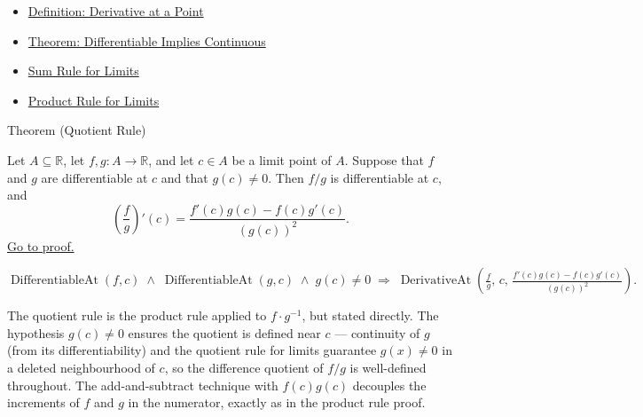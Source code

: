 \begin{dependencies}
\begin{itemize}
  \item \hyperref[def:derivative-at-a-point]{Definition: Derivative at a Point}
  \item \hyperref[thm:differentiable-implies-continuous]{Theorem: Differentiable Implies Continuous}
  \item \hyperref[thm:limit-sum]{Sum Rule for Limits}
  \item \hyperref[thm:limit-product]{Product Rule for Limits}
\end{itemize}
\end{dependencies}


\begin{theorembox}{Theorem (Quotient Rule)}
\begin{theorem}
\label{thm:quotient-rule}
Let $A \subseteq \mathbb{R}$, let $f, g : A \to \mathbb{R}$, and let $c \in A$ be a limit point of $A$. Suppose that $f$ and $g$ are differentiable at $c$ and that $g(c) \neq 0$. Then $f/g$ is differentiable at $c$, and
\[
\left(\frac{f}{g}\right)'(c) = \frac{f'(c)g(c) - f(c)g'(c)}{(g(c))^2}.
\]
\hyperref[prf:quotient-rule]{Go to proof.}
\end{theorem}
\end{theorembox}

\begin{remark*}
\[
\operatorname{DifferentiableAt}(f,c) \;\land\; \operatorname{DifferentiableAt}(g,c) \;\land\; g(c)\neq 0
\;\Rightarrow\;
\operatorname{DerivativeAt}\!\left(\tfrac{f}{g},\,c,\,\tfrac{f'(c)g(c)-f(c)g'(c)}{(g(c))^2}\right).
\]
\end{remark*}

\begin{remark*}[Interpretation]
The quotient rule is the product rule applied to $f \cdot g^{-1}$, but stated directly. The hypothesis $g(c) \neq 0$ ensures the quotient is defined near $c$ — continuity of $g$ (from its differentiability) and the quotient rule for limits guarantee $g(x) \neq 0$ in a deleted neighbourhood of $c$, so the difference quotient of $f/g$ is well-defined throughout. The add-and-subtract technique with $f(c)g(c)$ decouples the increments of $f$ and $g$ in the numerator, exactly as in the product rule proof.
\end{remark*}

